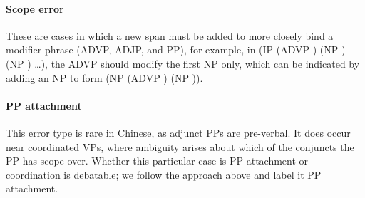 \paragraph{Scope error}
These are cases in which a new span must be added to more closely bind a modifier phrase (ADVP, ADJP, and PP), for example, in 
(IP (ADVP \mbox{}) (NP \mbox{}) (NP \mbox{}) \ldots), the ADVP should modify the first NP only, which can be indicated by adding an NP to form (NP (ADVP \mbox{}) (NP \mbox{})).

\paragraph{PP attachment} 
This error type is rare in Chinese, as adjunct PPs are pre-verbal.  It does
occur near coordinated VPs, where ambiguity arises about which of the conjuncts
the PP has scope over.  Whether this particular case is PP attachment or
coordination is debatable; we follow the approach above and
label it PP attachment.

